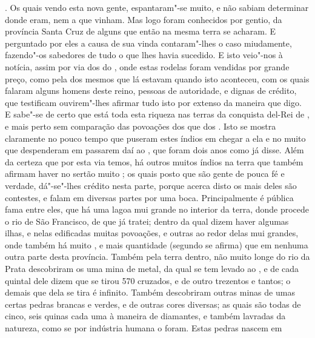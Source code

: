 . Os quais vendo esta nova gente, espantaram"-se muito, e não
sabiam determinar donde eram, nem a que vinham. Mas logo foram
conhecidos por gentio, da província Santa Cruz de alguns 		%
que então na mesma terra se acharam. E perguntado por eles a causa de
sua vinda contaram"-lhes o caso miudamente, fazendo"-os sabedores de tudo
o que lhes havia sucedido. E isto veio"-nos à notícia, assim por via
dos  do , onde estas rodelas foram vendidas por grande
preço, como pela dos mesmos  que lá estavam quando isto
aconteceu, com os quais falaram alguns homens deste reino, pessoas de
autoridade, e dignas de crédito, que testificam ouvirem"-lhes afirmar
tudo isto por extenso da maneira que digo.  E sabe"-se de certo que está
toda esta riqueza nas terras da conquista del-Rei de , e mais
perto sem comparação das povoações dos  que dos .
Isto se mostra claramente no pouco tempo que puseram estes índios em		%
chegar a ela e no muito que despenderam em passarem daí ao , que
foram dois anos como já disse. Além da certeza que por esta via temos,
há outros muitos índios na terra que também afirmam haver no sertão
muito ; os quais posto que são gente de pouca fé e verdade,	%
dá"-se"-lhes crédito nesta parte, porque acerca disto os mais deles são
contestes, e falam em diversas partes por uma boca. Principalmente é
pública fama entre eles, que há uma lagoa mui grande no interior da
terra, donde procede o rio de São Francisco, de que já tratei; dentro		%
da qual dizem haver algumas ilhas, e nelas edificadas muitas povoações,
e outras ao redor delas mui grandes, onde também há muito , e mais
quantidade (segundo se afirma) que em nenhuma outra parte desta
província. Também pela terra dentro, não muito longe do rio da Prata		%
descobriram os  uma mina de metal, da qual se tem levado 
ao , e de cada quintal dele dizem que se tirou 570
cruzados, e de outro trezentos e tantos; o demais que dela se tira é
 infinito. Também descobriram outras minas de umas certas pedras		%
brancas e verdes, e de outras cores diversas; as quais são todas de
cinco, seis quinas cada uma à maneira de diamantes, e também lavradas da		%
natureza, como se por indústria humana o foram. Estas pedras nascem em
